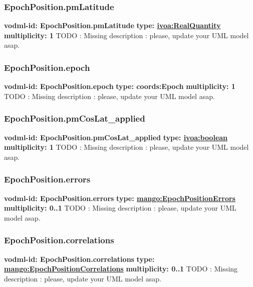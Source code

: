     \subsubsection{EpochPosition.pmLatitude}
      \textbf{vodml-id: EpochPosition.pmLatitude} \newline
      \textbf{type: \hyperref[sect:ivoa]{ivoa:RealQuantity}} \newline
      \textbf{multiplicity: 1} \newline
      TODO : Missing description : please, update your UML model asap.

    \subsubsection{EpochPosition.epoch}
      \textbf{vodml-id: EpochPosition.epoch} \newline
      \textbf{type: coords:Epoch} \newline
      \textbf{multiplicity: 1} \newline
      TODO : Missing description : please, update your UML model asap.

    \subsubsection{EpochPosition.pmCosLat_applied}
      \textbf{vodml-id: EpochPosition.pmCosLat_applied} \newline
      \textbf{type: \hyperref[sect:ivoa]{ivoa:boolean}} \newline
      \textbf{multiplicity: 1} \newline
      TODO : Missing description : please, update your UML model asap.

    \subsubsection{EpochPosition.errors}
      \textbf{vodml-id: EpochPosition.errors} \newline
      \textbf{type: \hyperref[sect:EpochPositionErrors]{mango:EpochPositionErrors}} \newline
      \textbf{multiplicity: 0..1} \newline
      TODO : Missing description : please, update your UML model asap.

    \subsubsection{EpochPosition.correlations}
      \textbf{vodml-id: EpochPosition.correlations} \newline
      \textbf{type: \hyperref[sect:EpochPositionCorrelations]{mango:EpochPositionCorrelations}} \newline
      \textbf{multiplicity: 0..1} \newline
      TODO : Missing description : please, update your UML model asap.

